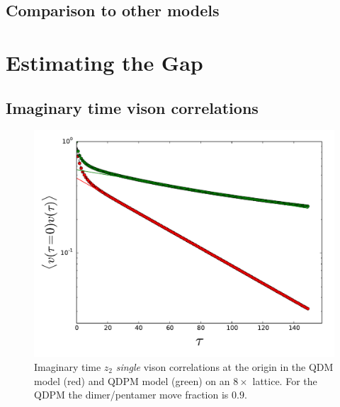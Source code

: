 \documentclass[aps,floatfix,11pt,twocolumn]{revtex4-1}
\begin{document}
    \subsection{Comparison to other models}

\section{Estimating the Gap}
    \subsection{Imaginary time vison correlations}
    \begin{figure}[htpb]
        \centering
        \includegraphics[width=0.8\linewidth]{z2_origin_vison_time_cor.pdf}
        \caption{Imaginary time $z_2$ \textit{single} vison correlations at the origin in the QDM model (red) and QDPM
        model (green) on an $8\times$ lattice. For the QDPM the dimer/pentamer move fraction is $0.9$.}
        \label{fig:name}
    \end{figure}
\end{document}
